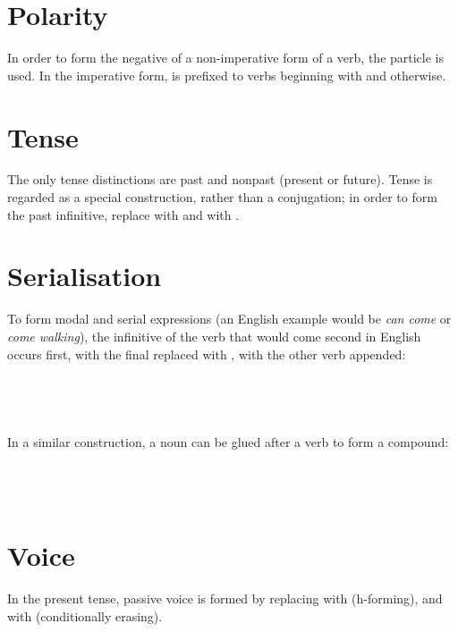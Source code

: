 \documentclass{book}
\begin{document}
\section{Polarity}

In order to form the negative of a non-imperative form of a verb, the particle  is used. In the imperative form,  is prefixed to verbs beginning with  and  otherwise.

\section{Tense}

The only tense distinctions are past and nonpast (present or future). Tense is regarded as a special construction, rather than a conjugation; in order to form the past infinitive, replace  with  and  with .

\section{Serialisation}

\label{sec:serialisation}

To form modal and serial expressions (an English example would be \emph{can come} or \emph{come walking}), the infinitive of the verb that would come second in English occurs first, with the final  replaced with , with the other verb appended: \\
~\\
 \\
 \\
  \\

In a similar construction, a noun can be glued after a verb to form a compound: \\
~\\
 \\
 \\
 

\section{Voice}

In the present tense, passive voice is formed by replacing  with  (h-forming), and  with  (conditionally erasing).
\end{document}
